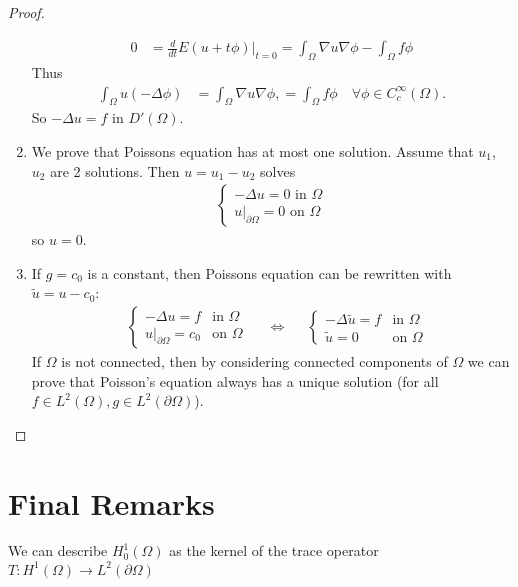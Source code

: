 \documentclass{report}
\theoremstyle{tommy}
\begin{document}
\begin{proof}
\begin{enumerate}[label=Step \arabic*:]
\begin{align*}
        0 
        &= \frac{d}{dt} E(u + t \phi)|_{t=0}
        = \int_\Omega \nabla u \nabla \phi - \int_\Omega f \phi
      \end{align*}
      Thus
      \begin{align*}
        \int_\Omega u(-\Delta \phi) 
        &= \int_\Omega \nabla u \nabla \phi,
        = \int_\Omega f \phi \quad \forall \phi \in C_c^\infty(\Omega).
      \end{align*}
      So \(- \Delta u = f\) in \(D'(\Omega)\).
      \item We prove that Poissons equation has at most one solution. Assume that \(u_1\), \(u_2\) are 2 solutions. Then \(u = u_1 - u_2\) solves 
      \begin{align*}
        \begin{cases}
          - \Delta u = 0 \text{ in } \Omega \\ u|_{\partial \Omega} = 0 \text{ on } \Omega
        \end{cases}
      \end{align*}
      so \(u = 0\).
      \item If \(g = c_0\) is a constant, then Poissons equation can be rewritten with \(\tilde u = u - c_0\):
      \begin{align*}
        &\begin{cases}
          - \Delta u = f &\text{in } \Omega \\ u|_{\partial \Omega} = c_0 &\text{on } \Omega
        \end{cases}
        &&\Leftrightarrow
        &&\begin{cases}
          - \Delta \tilde u = f &\text{in } \Omega \\\tilde u = 0 &\text{on } \Omega
        \end{cases}
      \end{align*}
      If \(\Omega\) is not connected, then by considering connected components of \(\Omega\) we can prove that Poisson's equation always has a unique solution (for all \(f \in L^2(\Omega), g \in L^2(\partial \Omega)\)).
    \end{enumerate}
  \end{proof}

  \section{Final Remarks}
  We can describe \(H_0^1(\Omega)\) as the kernel of the trace operator \(T: H^1(\Omega) \to L^2(\partial \Omega)\)
\end{document}
